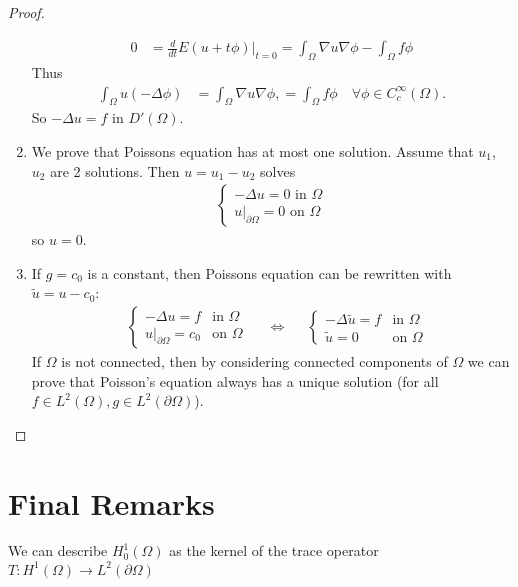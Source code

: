 \documentclass{report}
\theoremstyle{tommy}
\begin{document}
\begin{proof}
\begin{enumerate}[label=Step \arabic*:]
\begin{align*}
        0 
        &= \frac{d}{dt} E(u + t \phi)|_{t=0}
        = \int_\Omega \nabla u \nabla \phi - \int_\Omega f \phi
      \end{align*}
      Thus
      \begin{align*}
        \int_\Omega u(-\Delta \phi) 
        &= \int_\Omega \nabla u \nabla \phi,
        = \int_\Omega f \phi \quad \forall \phi \in C_c^\infty(\Omega).
      \end{align*}
      So \(- \Delta u = f\) in \(D'(\Omega)\).
      \item We prove that Poissons equation has at most one solution. Assume that \(u_1\), \(u_2\) are 2 solutions. Then \(u = u_1 - u_2\) solves 
      \begin{align*}
        \begin{cases}
          - \Delta u = 0 \text{ in } \Omega \\ u|_{\partial \Omega} = 0 \text{ on } \Omega
        \end{cases}
      \end{align*}
      so \(u = 0\).
      \item If \(g = c_0\) is a constant, then Poissons equation can be rewritten with \(\tilde u = u - c_0\):
      \begin{align*}
        &\begin{cases}
          - \Delta u = f &\text{in } \Omega \\ u|_{\partial \Omega} = c_0 &\text{on } \Omega
        \end{cases}
        &&\Leftrightarrow
        &&\begin{cases}
          - \Delta \tilde u = f &\text{in } \Omega \\\tilde u = 0 &\text{on } \Omega
        \end{cases}
      \end{align*}
      If \(\Omega\) is not connected, then by considering connected components of \(\Omega\) we can prove that Poisson's equation always has a unique solution (for all \(f \in L^2(\Omega), g \in L^2(\partial \Omega)\)).
    \end{enumerate}
  \end{proof}

  \section{Final Remarks}
  We can describe \(H_0^1(\Omega)\) as the kernel of the trace operator \(T: H^1(\Omega) \to L^2(\partial \Omega)\)
\end{document}
